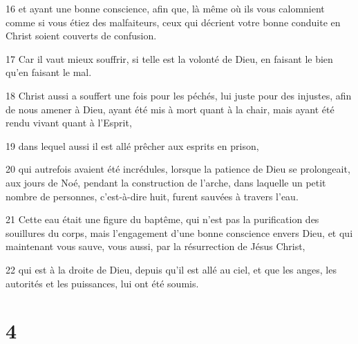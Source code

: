 \par 16 et ayant une bonne conscience, afin que, là même où ils vous calomnient comme si vous étiez des malfaiteurs, ceux qui décrient votre bonne conduite en Christ soient couverts de confusion.
\par 17 Car il vaut mieux souffrir, si telle est la volonté de Dieu, en faisant le bien qu'en faisant le mal.
\par 18 Christ aussi a souffert une fois pour les péchés, lui juste pour des injustes, afin de nous amener à Dieu, ayant été mis à mort quant à la chair, mais ayant été rendu vivant quant à l'Esprit,
\par 19 dans lequel aussi il est allé prêcher aux esprits en prison,
\par 20 qui autrefois avaient été incrédules, lorsque la patience de Dieu se prolongeait, aux jours de Noé, pendant la construction de l'arche, dans laquelle un petit nombre de personnes, c'est-à-dire huit, furent sauvées à travers l'eau.
\par 21 Cette eau était une figure du baptême, qui n'est pas la purification des souillures du corps, mais l'engagement d'une bonne conscience envers Dieu, et qui maintenant vous sauve, vous aussi, par la résurrection de Jésus Christ,
\par 22 qui est à la droite de Dieu, depuis qu'il est allé au ciel, et que les anges, les autorités et les puissances, lui ont été soumis.

\chapter{4}

